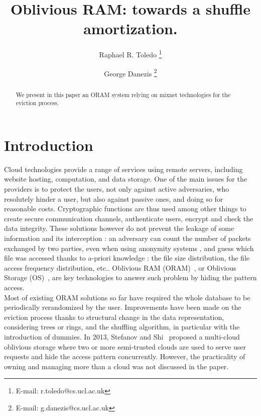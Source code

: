 \documentclass[a4paper]{article}
\begin{document}
\author{Raphael R. Toledo \thanks{E-mail: r.toledo@cs.ucl.ac.uk} }
\author{George Danezis \thanks{E-mail: g.danezis@cs.ucl.ac.uk} }


\title{Oblivious RAM: towards a shuffle amortization.}

\maketitle

\begin{abstract}
{
We present in this paper an ORAM system relying on mixnet technologies for the eviction process.
}
\end{abstract}

\section{Introduction}
Cloud technologies provide a range of services using remote servers, including website hosting, computation, and data storage. One of the main issues for the providers is to protect the users, not only against active adversaries, who resolutely hinder a user, but also against passive ones, and doing so for reasonable costs. 
Cryptographic functions are thus used among other things to create secure communication channels, authenticate users, encrypt and check the data integrity. These solutions however do not prevent the leakage of some information and its interception : an adversary can count the number of packets exchanged by two parties, even when using anonymity systems \cite{murdoch2005}, and guess which file was accessed thanks to a-priori knowledge : the file size distribution, the file access frequency distribution, etc..
Oblivious RAM (ORAM)~\cite{goldreich87}, or Oblivious Storage (OS)~\cite{boneh2011}, are key technologies to answer such problem by hiding the pattern access.\\

Most of existing ORAM solutions so far have required the whole database to be periodically rerandomized by the user. Improvements have been made on the eviction process thanks to structural change in the data representation, considering trees or rings, and the shuffling algorithm, in particular with the introduction of dummies.
In 2013, Stefanov and Shi~\cite{stefanov2013} proposed a multi-cloud oblivious storage where two or more semi-trusted clouds are used to serve user requests and hide the access pattern concurrently. However, the practicality of owning and managing more than a cloud was not discussed in the paper. \\
\end{document}
